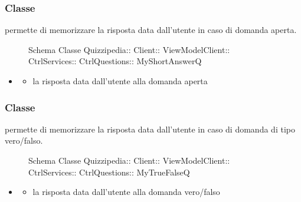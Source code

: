 \subsubsection{Classe }
permette di memorizzare la risposta data dall'utente in caso di domanda aperta.
\begin{figure}[H]
\centering
\noindent{}
\caption[Schema Classe MyShortAnswerQ]{Schema Classe Quizzipedia:: Client:: ViewModelClient:: CtrlServices:: CtrlQuestions:: MyShortAnswerQ}
\end{figure}
\begin{itemize}
\item {}
\begin{itemize}
\item {}
\newline
la risposta data dall'utente alla domanda aperta
\end{itemize}
\end{itemize}
\subsubsection{Classe }
permette di memorizzare la risposta data dall'utente in caso di domanda di tipo vero/falso.
\begin{figure}[H]
\centering
\noindent{}
\caption[Schema Classe MyTrueFalseQ]{Schema Classe Quizzipedia:: Client:: ViewModelClient:: CtrlServices:: CtrlQuestions:: MyTrueFalseQ}
\end{figure}
\begin{itemize}
\item {}
\begin{itemize}
\item {}
\newline
la risposta data dall'utente alla domanda vero/falso
\end{itemize}
\end{itemize}
